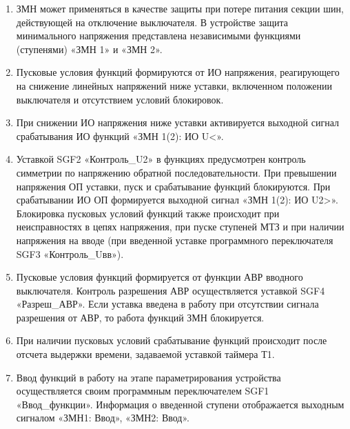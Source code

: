 
\color{black}

\begin{enumerate}

\item
ЗМН может применяться в качестве защиты при потере питания секции шин, действующей на отключение выключателя. В устройстве защита минимального напряжения представлена независимыми функциями (ступенями) «ЗМН 1» и «ЗМН 2».

\item
Пусковые условия функций формируются от ИО напряжения, реагирующего на снижение линейных напряжений ниже уставки, включенном положении выключателя и отсутствием условий блокировок.

\item
При  снижении  ИО  напряжения  ниже  уставки  активируется  выходной  сигнал  срабатывания ИО функций «ЗМН 1(2): ИО U<».

\item
Уставкой  SGF2 «Контроль\_U2»  в  функциях  предусмотрен  контроль  симметрии  по  напряжению  обратной последовательности. При превышении напряжения ОП уставки, пуск и срабатывание функций блокируются. При срабатывании ИО ОП формируется выходной сигнал «ЗМН 1(2): ИО U2>». Блокировка пусковых условий функций также происходит при неисправностях в цепях напряжения, при пуске ступеней МТЗ и при наличии напряжения на вводе (при введенной уставке программного переключателя SGF3 «Контроль\_Uвв»).

\item
Пусковые  условия  функций  формируется  от  функции  АВР  вводного  выключателя.  Контроль разрешения АВР осуществляется уставкой SGF4 «Разреш\_АВР». Если уставка введена в работу при отсутствии сигнала разрешения от АВР, то работа функций ЗМН блокируется. 

\item
При наличии пусковых условий срабатывание функций происходит после отсчета выдержки времени, задаваемой уставкой таймера Т1. 

\item
Ввод функций в работу на этапе параметрирования устройства осуществляется своим программным переключателем SGF1 «Ввод\_функции». Информация о введенной ступени отображается выходным сигналом «ЗМН1: Ввод», «ЗМН2: Ввод».


\end{enumerate}

